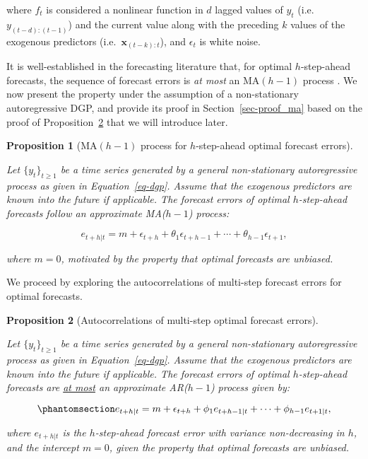 \documentclass[
  11pt,
  a4paper,
]{article}
\theoremstyle{plain}
\newtheorem{proposition}{Proposition}[section]
\theoremstyle{remark}
\begin{document}
where \(f_{t}\) is considered a nonlinear function in \(d\) lagged
values of \(y_t\) (i.e.~\(y_{(t-d):(t-1)}\)) and the current value along
with the preceding \(k\) values of the exogenous predictors
(i.e.~\(\bm{x}_{(t-k):t}\)), and \(\epsilon_t\) is white noise.

It is well-established in the forecasting literature that, for optimal
\(h\)-step-ahead forecasts, the sequence of forecast errors is \emph{at
most} an MA\((h-1)\) process \autocite{harvey1997,diebold2017}. We now
present the property under the assumption of a non-stationary
autoregressive DGP, and provide its proof in Section~\ref{sec-proof_ma}
based on the proof of Proposition~\ref{prp-ar} that we will introduce
later.

\begin{proposition}[MA\((h-1)\) process for \(h\)-step-ahead optimal
forecast errors]\protect\hypertarget{prp-ma}{}\label{prp-ma}

Let \(\{y_t\}_{t \geq 1}\) be a time series generated by a general
non-stationary autoregressive process as given in Equation~\ref{eq-dgp}.
Assume that the exogenous predictors are known into the future if
applicable. The forecast errors of optimal \(h\)-step-ahead forecasts
follow an approximate MA(\(h-1\)) process:

\[
e_{t+h|t} = m + \epsilon_{t+h} + \theta_1\epsilon_{t+h-1} + \cdots + \theta_{h-1}\epsilon_{t+1},
\]

where \(m=0\), motivated by the property that optimal forecasts are
unbiased.

\end{proposition}

We proceed by exploring the autocorrelations of multi-step forecast
errors for optimal forecasts.

\begin{proposition}[Autocorrelations of multi-step optimal forecast
errors]\protect\hypertarget{prp-ar}{}\label{prp-ar}

Let \(\{y_t\}_{t \geq 1}\) be a time series generated by a general
non-stationary autoregressive process as given in Equation~\ref{eq-dgp}.
Assume that the exogenous predictors are known into the future if
applicable. The forecast errors of optimal \(h\)-step-ahead forecasts
are \ul{at most} an approximate AR(\(h-1\)) process given by:

\begin{equation}\phantomsection\label{eq-ar}{
e_{t+h|t} = m + \epsilon_{t+h} + \phi_1e_{t+h-1|t} + \cdots + \phi_{h-1}e_{t+1|t},
}\end{equation}

where \(e_{t+h|t}\) is the \(h\)-step-ahead forecast error with variance
non-decreasing in \(h\), and the intercept \(m=0\), given the property
that optimal forecasts are unbiased.

\end{proposition}
\end{document}
